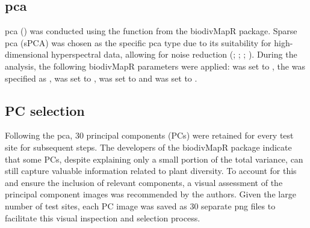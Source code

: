 \subsection{\ac{pca}}
\ac{pca} (\cite{wold_principal_1987}) was conducted using the  function from the biodivMapR package. Sparse \ac{pca} (sPCA) was chosen as the specific \ac{pca} type due to its suitability for high-dimensional hyperspectral data, allowing for noise reduction (\cite{feret_mapping_2014}; \cite{feret_biodivmapr_2020}; \cite{li_dimensionality_2022}; \cite{ruiz_hidalgo_dimensionality_2021}). During the analysis, the following biodivMapR parameters were applied:  was set to , the  was specified as ,  was set to ,  was set to  and  was set to .

\subsection{PC selection}
Following the \ac{pca}, 30 principal components (PCs) were retained for every test site for subsequent steps. The developers of the biodivMapR package indicate that some PCs, despite explaining only a small portion of the total variance, can still capture valuable information related to plant diversity. To account for this and ensure the inclusion of relevant components, a visual assessment of the principal component images was recommended by the authors. Given the large number of test sites, each PC image was saved as 30 separate \ac{png} files to facilitate this visual inspection and selection process.

